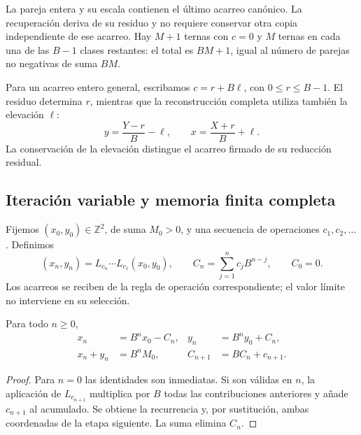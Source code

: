 La pareja entera y su escala contienen el último acarreo canónico. La
recuperación deriva de su residuo y no requiere conservar otra copia
independiente de ese acarreo. Hay \(M+1\) ternas con \(c=0\) y
\(M\) ternas en cada una de las \(B-1\) clases restantes: el total
es \(BM+1\), igual al número de parejas no negativas de suma \(BM\).

Para un acarreo entero general, escribamos
\(c=r+B\ell\), con \(0\leq r\leq B-1\). El residuo determina
\(r\), mientras que la reconstrucción completa utiliza también la
elevación \(\ell\):
\begin{equation}
 y=\frac{Y-r}{B}-\ell,\qquad
 x=\frac{X+r}{B}+\ell.
 \label{lib03:elevacion}
\end{equation}
La conservación de la elevación distingue el acarreo firmado de su
reducción residual.

\subsection{Iteración variable y memoria finita completa}
\label{lib03:memoria}

Fijemos \((x_0,y_0)\in\mathbb Z^2\), de suma \(M_0>0\), y una
secuencia de operaciones \(c_1,c_2,\ldots\). Definimos
\begin{equation}
 (x_n,y_n)=L_{c_n}\cdots L_{c_1}(x_0,y_0),\qquad
 C_n=\sum_{j=1}^n c_jB^{n-j},\qquad C_0=0.
 \label{lib03:registro-acumulado}
\end{equation}
Los acarreos se reciben de la regla de operación correspondiente; el
valor límite no interviene en su selección.

\begin{theorem}
\label{lib03:teo-acumulacion}
Para todo \(n\geq0\),
\begin{equation}
 \begin{aligned}
 x_n&=B^nx_0-C_n,& y_n&=B^ny_0+C_n,\\
 x_n+y_n&=B^nM_0,& C_{n+1}&=BC_n+c_{n+1}.
 \end{aligned}
 \label{lib03:iteracion-exacta}
\end{equation}
\end{theorem}

\begin{proof}
Para \(n=0\) las identidades son inmediatas. Si son válidas en
\(n\), la aplicación de \(L_{c_{n+1}}\) multiplica por \(B\) todas
las contribuciones anteriores y añade \(c_{n+1}\) al acumulado.
Se obtiene la recurrencia y, por sustitución, ambas coordenadas de la
etapa siguiente. La suma elimina \(C_n\).
\end{proof}

